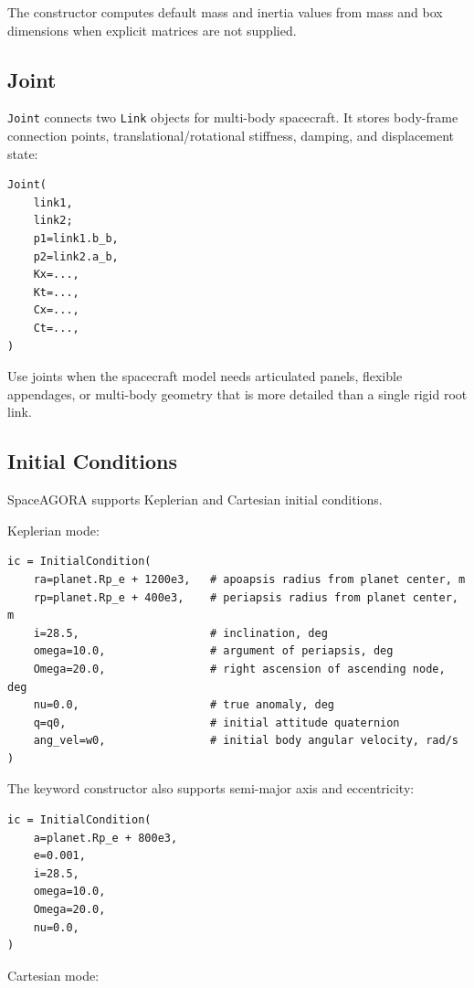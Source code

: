 \documentclass[11pt]{article}
\begin{document}
The constructor computes default mass and inertia values from mass and box
dimensions when explicit matrices are not supplied.

\subsection{Joint}

\texttt{Joint} connects two \texttt{Link} objects for multi-body spacecraft.
It stores body-frame connection points, translational/rotational stiffness,
damping, and displacement state:

\begin{lstlisting}
Joint(
    link1,
    link2;
    p1=link1.b_b,
    p2=link2.a_b,
    Kx=...,
    Kt=...,
    Cx=...,
    Ct=...,
)
\end{lstlisting}

Use joints when the spacecraft model needs articulated panels, flexible
appendages, or multi-body geometry that is more detailed than a single rigid
root link.

\subsection{Initial Conditions}

SpaceAGORA supports Keplerian and Cartesian initial conditions.

Keplerian mode:

\begin{lstlisting}
ic = InitialCondition(
    ra=planet.Rp_e + 1200e3,   # apoapsis radius from planet center, m
    rp=planet.Rp_e + 400e3,    # periapsis radius from planet center, m
    i=28.5,                    # inclination, deg
    omega=10.0,                # argument of periapsis, deg
    Omega=20.0,                # right ascension of ascending node, deg
    nu=0.0,                    # true anomaly, deg
    q=q0,                      # initial attitude quaternion
    ang_vel=w0,                # initial body angular velocity, rad/s
)
\end{lstlisting}

The keyword constructor also supports semi-major axis and eccentricity:

\begin{lstlisting}
ic = InitialCondition(
    a=planet.Rp_e + 800e3,
    e=0.001,
    i=28.5,
    omega=10.0,
    Omega=20.0,
    nu=0.0,
)
\end{lstlisting}

Cartesian mode:
\end{document}
